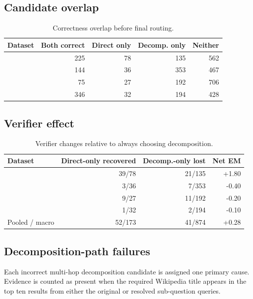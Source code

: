 \subsection{Candidate overlap}

\begin{table}[h]
\caption{Correctness overlap before final routing.}
\label{tab:path-overlap}
\centering
\small
\setlength{\tabcolsep}{5pt}
\begin{tabular}{lrrrr}
\toprule
Dataset & Both correct & Direct only & Decomp. only & Neither \\
\midrule
\hotpot{} & 225 & 78 & 135 & 562 \\
\twowiki{} & 144 & 36 & 353 & 467 \\
\musique{} & 75 & 27 & 192 & 706 \\
\popqa{} & 346 & 32 & 194 & 428 \\
\bottomrule
\end{tabular}
\end{table}

\subsection{Verifier effect}

\begin{table}[h]
\caption{Verifier changes relative to always choosing decomposition.}
\label{tab:verifier-effect}
\centering
\small
\setlength{\tabcolsep}{5pt}
\begin{tabular}{lrrr}
\toprule
Dataset & Direct-only recovered & Decomp.-only lost & Net EM \\
\midrule
\hotpot{} & 39/78 & 21/135 & +1.80 \\
\twowiki{} & 3/36 & 7/353 & -0.40 \\
\musique{} & 9/27 & 11/192 & -0.20 \\
\popqa{} & 1/32 & 2/194 & -0.10 \\
\midrule
Pooled / macro & 52/173 & 41/874 & +0.28 \\
\bottomrule
\end{tabular}
\end{table}

\subsection{Decomposition-path failures}

Each incorrect multi-hop decomposition candidate is assigned one primary
cause. Evidence is counted as present when the required Wikipedia title
appears in the top ten results from either the original or resolved
sub-question queries.

